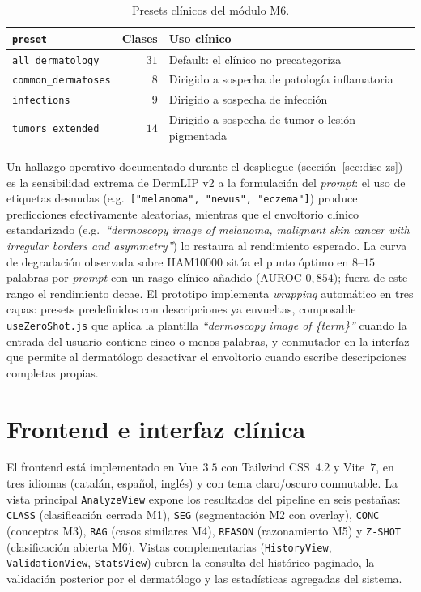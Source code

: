 \begin{table}[H]
\centering
\footnotesize
\setlength{\tabcolsep}{4pt}
\renewcommand{\arraystretch}{0.95}
\caption{Presets clínicos del módulo M6.}
\label{tab:dermapixel-presets}
\begin{tabular}{lrl}
\hline
\texttt{preset}            & Clases & Uso clínico \\
\hline
\texttt{all\_dermatology}  & $31$   & Default: el clínico no precategoriza \\
\texttt{common\_dermatoses}& $8$    & Dirigido a sospecha de patología inflamatoria \\
\texttt{infections}        & $9$    & Dirigido a sospecha de infección \\
\texttt{tumors\_extended}  & $14$   & Dirigido a sospecha de tumor o lesión pigmentada \\
\hline
\end{tabular}
\end{table}

Un hallazgo operativo documentado durante el despliegue
(secci\'on~\ref{sec:disc-zs}) es la sensibilidad extrema de DermLIP v2 a
la formulación del \emph{prompt}: el uso de etiquetas
desnudas (e.g.\ \texttt{["melanoma", "nevus", "eczema"]}) produce
predicciones efectivamente aleatorias, mientras que el envoltorio
clínico estandarizado (e.g.~\emph{``dermoscopy image of melanoma,
malignant skin cancer with irregular borders and asymmetry''}) lo
restaura al rendimiento esperado. La curva de degradación
observada sobre HAM10000 sitúa el punto óptimo en
$8$--$15$ palabras por \emph{prompt} con un rasgo clínico
añadido (AUROC $0{,}854$); fuera de este rango el rendimiento
decae. El prototipo implementa \emph{wrapping} automático en tres
capas: presets predefinidos con descripciones ya envueltas,
composable \texttt{useZeroShot.js} que aplica la plantilla
\emph{``dermoscopy image of \{term\}''} cuando la entrada del
usuario contiene cinco o menos palabras, y conmutador en la
interfaz que permite al dermatólogo desactivar el envoltorio
cuando escribe descripciones completas propias.

\section{Frontend e interfaz clínica}
\label{sec:dermapixel-frontend}

El frontend está implementado en Vue~$3.5$ con Tailwind
CSS~$4.2$ y Vite~$7$, en tres idiomas (catalán, español,
inglés) y con tema claro/oscuro conmutable. La vista principal
\texttt{AnalyzeView} expone los resultados del pipeline en seis
pestañas: \texttt{CLASS} (clasificación cerrada M1),
\texttt{SEG} (segmentación M2 con overlay), \texttt{CONC}
(conceptos M3), \texttt{RAG} (casos similares M4),
\texttt{REASON} (razonamiento M5) y \texttt{Z-SHOT}
(clasificación abierta M6). Vistas complementarias
(\texttt{HistoryView}, \texttt{ValidationView},
\texttt{StatsView}) cubren la consulta del histórico paginado, la
validación posterior por el dermatólogo y las estadísticas
agregadas del sistema.

